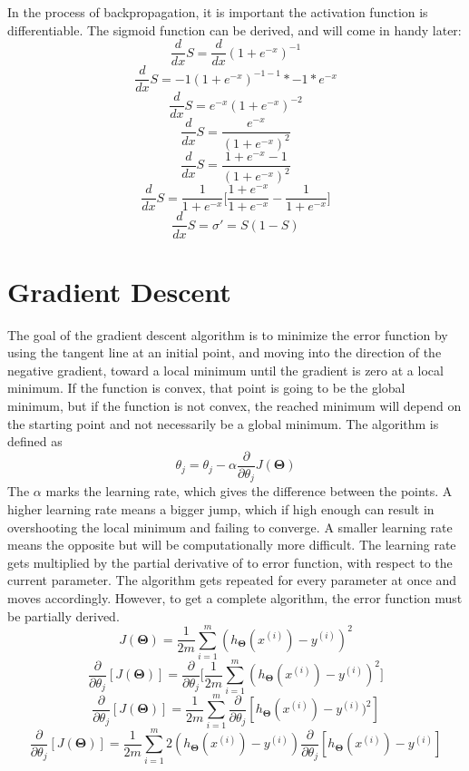 \documentclass[a4paper,12pt]{article}
\begin{document}
In the process of backpropagation, it is important the activation function is differentiable. The sigmoid function can be derived, and will come in handy later:
\[\frac{d}{dx}S = \frac{d}{dx}(1+e^{-x})^{-1}\]
\[\frac{d}{dx}S = -1(1+e^{-x})^{-1-1} * -1 * e^{-x}\]
\[\frac{d}{dx}S = e^{-x}(1+e^{-x})^{-2}\]
\[\frac{d}{dx}S = \frac{e^{-x}}{(1+e^{-x})^2}\]
\[\frac{d}{dx}S = \frac{1 + e^{-x} - 1}{(1+e^{-x})^2}\]
\[\frac{d}{dx}S = \frac{1}{1+e^{-x}}\bigg[\frac{1+e^{-x}}{1+e^{-x}} - \frac{1}{1+e^{-x}}\bigg] \]
\[\frac{d}{dx}S = \sigma' = S(1-S)\]

\section{Gradient Descent}
The goal of the gradient descent algorithm is to minimize the error function by using the tangent line at an initial point, and moving into the direction of the negative gradient, toward a local minimum until the gradient is zero at a local minimum. If the function is convex, that point is going to be the global minimum, but if the function is not convex, the reached minimum will depend on the starting point and not necessarily be a global minimum. The algorithm is defined as \[\theta_j = \theta_j - \alpha \frac{\partial}{\partial\theta_j} J(\boldsymbol{\Theta})\] The \(\alpha\) marks the learning rate, which gives the difference between the points. A higher learning rate means a bigger jump, which if high enough can result in overshooting the local minimum and failing to converge. A smaller learning rate means the opposite but will be computationally more difficult. The learning rate gets multiplied by the partial derivative of to error function, with respect to the current parameter. The algorithm gets repeated for every parameter at once and moves accordingly. However, to get a complete algorithm, the error function must be partially derived. 
\[J(\boldsymbol{\Theta}) = \frac{1}{2m} \sum_{i=1}^m (h_{\boldsymbol{\Theta}}(x^{(i)}) - y^{(i)})^2\]
\[\frac{\partial}{\partial\theta_j} [J(\boldsymbol{\Theta})] = \frac{\partial}{\partial\theta_j} \Big[ \frac{1}{2m} \sum_{i=1}^m (h_{\boldsymbol{\Theta}}(x^{(i)}) - y^{(i)})^2\Big]\]
\[\frac{\partial}{\partial\theta_j} [J(\boldsymbol{\Theta})] = \frac{1}{2m} \sum_{i=1}^m \frac{\partial}{\partial\theta_j} [h_{\boldsymbol{\Theta}}(x^{(i)}) - y^{(i)})^2]\]
\[\frac{\partial}{\partial\theta_j} [J(\boldsymbol{\Theta})] = \frac{1}{2m} \sum_{i=1}^m 2(h_{\boldsymbol{\Theta}}(x^{(i)}) - y^{(i)}) \frac{\partial}{\partial\theta_j}[h_{\boldsymbol{\Theta}}(x^{(i)}) - y^{(i)}]\]
\end{document}
